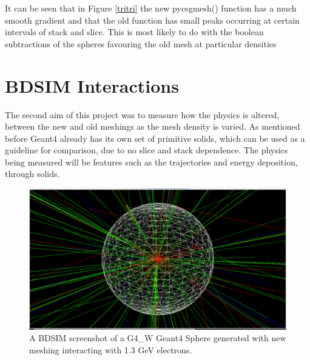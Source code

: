 \documentclass[12pt,a4paper]{article}
\begin{document}
\noindent It can be seen that in Figure \ref{tritri} the new pycsgmesh() function has a much smooth gradient and that the old function has small peaks occurring at certain intervals of stack and slice. This is most likely to do with the boolean subtractions of the spheres favouring the old mesh at particular densities


\section{BDSIM Interactions}
\label{int}
The second aim of this project was to measure how the physics is altered, between the new and old meshings as the mesh density is varied. As mentioned before Geant4 already has its own set of primitive solids, which can be used as a guideline for comparison, due to no slice and stack dependence. The physics being measured will be features such as the trajectories and energy deposition, through solids.

\begin{figure}[h!]
\centering
\includegraphics[scale=0.33]{Images//BDSIM//titanium.pdf}
\caption[width=\columnwidth]{A BDSIM screenshot of a G4\_W Geant4 Sphere generated with new meshing interacting with 1.3 GeV electrons.}
\label{black}
\end{figure}
\end{document}
